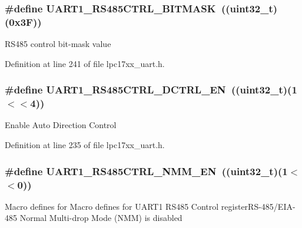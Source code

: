 \subsubsection[{\texorpdfstring{U\+A\+R\+T1\+\_\+\+R\+S485\+C\+T\+R\+L\+\_\+\+B\+I\+T\+M\+A\+SK}{UART1_RS485CTRL_BITMASK}}]{\setlength{\rightskip}{0pt plus 5cm}\#define U\+A\+R\+T1\+\_\+\+R\+S485\+C\+T\+R\+L\+\_\+\+B\+I\+T\+M\+A\+SK~(({\bf uint32\+\_\+t})(0x3\+F))}\hypertarget{group___u_a_r_t___private___macros_ga0ac8cbd1ed106b8867caf9d127d0eca2}{}\label{group___u_a_r_t___private___macros_ga0ac8cbd1ed106b8867caf9d127d0eca2}
R\+S485 control bit-\/mask value 

Definition at line 241 of file lpc17xx\+\_\+uart.\+h.

\subsubsection[{\texorpdfstring{U\+A\+R\+T1\+\_\+\+R\+S485\+C\+T\+R\+L\+\_\+\+D\+C\+T\+R\+L\+\_\+\+EN}{UART1_RS485CTRL_DCTRL_EN}}]{\setlength{\rightskip}{0pt plus 5cm}\#define U\+A\+R\+T1\+\_\+\+R\+S485\+C\+T\+R\+L\+\_\+\+D\+C\+T\+R\+L\+\_\+\+EN~(({\bf uint32\+\_\+t})(1$<$$<$4))}\hypertarget{group___u_a_r_t___private___macros_ga4fc9e8ce0ea18bc5ae717d3d00ec02eb}{}\label{group___u_a_r_t___private___macros_ga4fc9e8ce0ea18bc5ae717d3d00ec02eb}
Enable Auto Direction Control 

Definition at line 235 of file lpc17xx\+\_\+uart.\+h.

\subsubsection[{\texorpdfstring{U\+A\+R\+T1\+\_\+\+R\+S485\+C\+T\+R\+L\+\_\+\+N\+M\+M\+\_\+\+EN}{UART1_RS485CTRL_NMM_EN}}]{\setlength{\rightskip}{0pt plus 5cm}\#define U\+A\+R\+T1\+\_\+\+R\+S485\+C\+T\+R\+L\+\_\+\+N\+M\+M\+\_\+\+EN~(({\bf uint32\+\_\+t})(1$<$$<$0))}\hypertarget{group___u_a_r_t___private___macros_ga17e0186d392ae4cab45b95b94b325af9}{}\label{group___u_a_r_t___private___macros_ga17e0186d392ae4cab45b95b94b325af9}
Macro defines for Macro defines for U\+A\+R\+T1 R\+S485 Control register\+R\+S-\/485/\+E\+I\+A-\/485 Normal Multi-\/drop Mode (N\+MM) is disabled 

